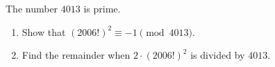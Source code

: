 The number $4013$ is prime.
\begin{enumerate}
\item[(a)] Show that $(2006!)^2\equiv-1\pmod{4013}$.
\item[(b)] Find the remainder when $2\cdot(2006!)^2$ is divided by $4013$.
\end{enumerate}
